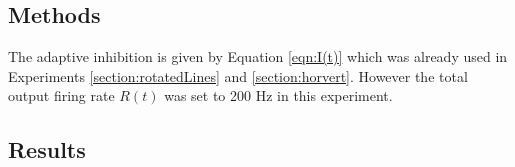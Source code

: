 \subsection{Methods}

The adaptive inhibition is given by Equation \ref{eqn:I(t)} which was already used in Experiments \ref{section:rotatedLines} and \ref{section:horvert}. However the total output firing rate $R(t)$ was set to 200 Hz in this experiment.

\subsection{Results}

 













